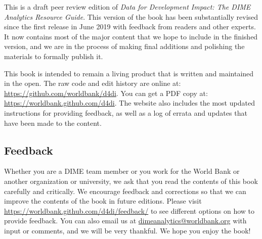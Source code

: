 This is a draft peer review edition of
\textit{Data for Development Impact:
The DIME Analytics Resource Guide}.
This version of the book has been substantially revised
since the first release in June 2019
with feedback from readers and other experts.
It now contains most of the major content
that we hope to include in the finished version,
and we are in the process of making final additions
and polishing the materials to formally publish it.

This book is intended to remain a living product
that is written and maintained in the open.
The raw code and edit history are online at:
\url{https://github.com/worldbank/d4di}.
You can get a PDF copy at:
\url{https://worldbank.github.com/d4di}.
The website also includes the most updated instructions
for providing feedback, as well as
a log of errata and updates that have been made to the content.

\subsection{Feedback}

Whether you are a DIME team member or you work for the World Bank
or another organization or university,
we ask that you read the contents of this book carefully and critically.
We encourage feedback and corrections
so that we can improve the contents of the book
in future editions. Please visit
\url{https://worldbank.github.com/d4di/feedback/} to
see different options on how to provide feedback.
You can also email us at \url{dimeanalytics@worldbank.org}
with input or comments, and we will be very thankful.
We hope you enjoy the book!
